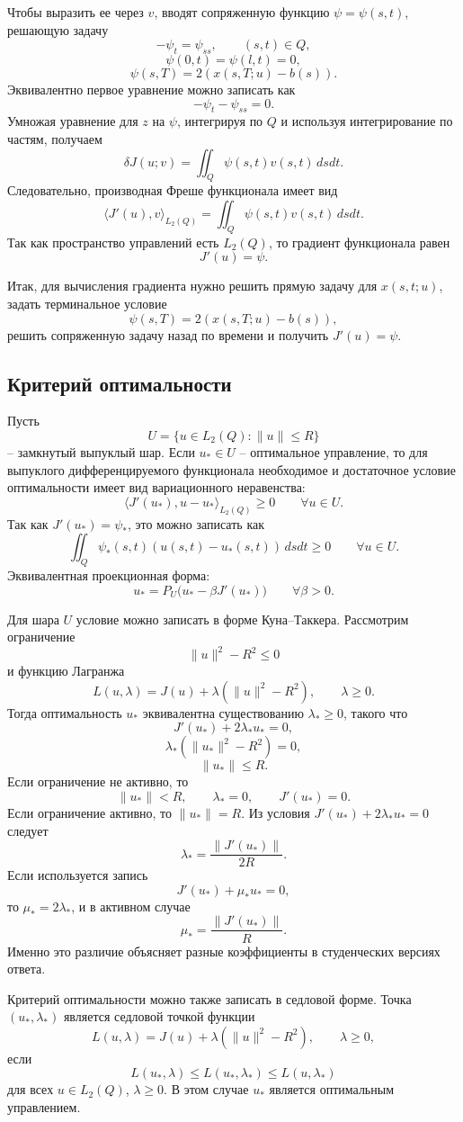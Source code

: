 \documentclass[12pt,a4paper]{article}
\begin{document}
Чтобы выразить ее через \(v\), вводят сопряженную функцию \(\psi=\psi(s,t)\), решающую задачу
\[
-\psi_t=\psi_{ss},
\qquad (s,t)\in Q,
\]
\[
\psi(0,t)=\psi(l,t)=0,
\]
\[
\psi(s,T)=2(x(s,T;u)-b(s)).
\]
Эквивалентно первое уравнение можно записать как
\[
-\psi_t-\psi_{ss}=0.
\]
Умножая уравнение для \(z\) на \(\psi\), интегрируя по \(Q\) и используя интегрирование по частям, получаем
\[
\delta J(u;v)=
\iint_Q \psi(s,t)v(s,t)\,dsdt.
\]
Следовательно, производная Фреше функционала имеет вид
\[
\langle J'(u),v\rangle_{L_2(Q)}=
\iint_Q \psi(s,t)v(s,t)\,dsdt.
\]
Так как пространство управлений есть \(L_2(Q)\), то градиент функционала равен
\[
J'(u)=\psi.
\]

Итак, для вычисления градиента нужно решить прямую задачу для \(x(s,t;u)\), задать терминальное условие
\[
\psi(s,T)=2(x(s,T;u)-b(s)),
\]
решить сопряженную задачу назад по времени и получить \(J'(u)=\psi\).

\subsection*{Критерий оптимальности}
Пусть
\[
U=\{u\in L_2(Q):\|u\|\le R\}
\]
-- замкнутый выпуклый шар. Если \(u_*\in U\) -- оптимальное управление, то для выпуклого дифференцируемого функционала необходимое и достаточное условие оптимальности имеет вид вариационного неравенства:
\[
\langle J'(u_*),u-u_*\rangle_{L_2(Q)}\ge0
\qquad \forall u\in U.
\]
Так как \(J'(u_*)=\psi_*\), это можно записать как
\[
\iint_Q \psi_*(s,t)(u(s,t)-u_*(s,t))\,dsdt\ge0
\qquad \forall u\in U.
\]
Эквивалентная проекционная форма:
\[
u_*=P_U\bigl(u_* -\beta J'(u_*)\bigr)
\qquad \forall \beta>0.
\]

Для шара \(U\) условие можно записать в форме Куна--Таккера. Рассмотрим ограничение
\[
\|u\|^2-R^2\le0
\]
и функцию Лагранжа
\[
L(u,\lambda)=J(u)+\lambda(\|u\|^2-R^2),
\qquad \lambda\ge0.
\]
Тогда оптимальность \(u_*\) эквивалентна существованию \(\lambda_*\ge0\), такого что
\[
J'(u_*)+2\lambda_*u_*=0,
\]
\[
\lambda_*(\|u_*\|^2-R^2)=0,
\]
\[
\|u_*\|\le R.
\]
Если ограничение не активно, то
\[
\|u_*\|<R,
\qquad
\lambda_*=0,
\qquad
J'(u_*)=0.
\]
Если ограничение активно, то \(\|u_*\|=R\). Из условия \(J'(u_*)+2\lambda_*u_*=0\) следует
\[
\lambda_*=\frac{\|J'(u_*)\|}{2R}.
\]
Если используется запись
\[
J'(u_*)+\mu_*u_*=0,
\]
то \(\mu_*=2\lambda_*\), и в активном случае
\[
\mu_*=\frac{\|J'(u_*)\|}{R}.
\]
Именно это различие объясняет разные коэффициенты в студенческих версиях ответа.

Критерий оптимальности можно также записать в седловой форме. Точка \((u_*,\lambda_*)\) является седловой точкой функции
\[
L(u,\lambda)=J(u)+\lambda(\|u\|^2-R^2),
\qquad \lambda\ge0,
\]
если
\[
L(u_*,\lambda)\le L(u_*,\lambda_*)\le L(u,\lambda_*)
\]
для всех \(u\in L_2(Q)\), \(\lambda\ge0\). В этом случае \(u_*\) является оптимальным управлением.
\end{document}
